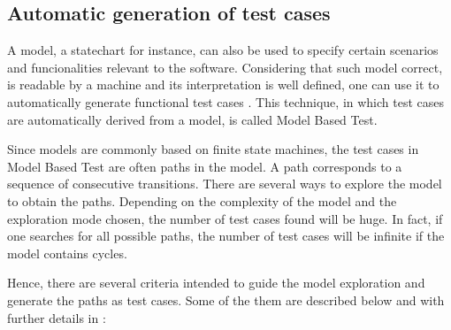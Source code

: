 \subsection{Automatic generation of test cases}
\label{sec-autotestcases}

A model, a statechart for instance, can also be used to specify certain scenarios and funcionalities relevant to the software. Considering that such model correct, is readable by a machine and its interpretation is well defined, one can use it to automatically generate functional test cases \cite{Maldonado:07}. This technique, in which test cases are automatically derived from a model, is called Model Based Test.

Since models are commonly based on finite state machines, the test cases in Model Based Test are often paths in the model. A path corresponds to a sequence of consecutive transitions. There are several ways to explore the model to obtain the paths. Depending on the complexity of the model and the exploration mode chosen, the number of test cases found will be huge. In fact, if one searches for all possible paths, the number of test cases will be infinite if the model contains cycles.

Hence, there are several criteria intended to guide the model exploration and generate the paths as test cases. Some of the them are described below and with further details in \cite{inpe10}:

